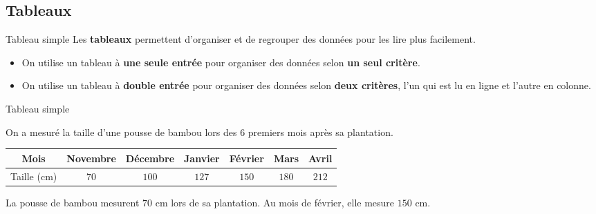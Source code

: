\begin{pageCours} 

\section{Tableaux}

\begin{DefT}{Tableau simple}
Les \textbf{tableaux} permettent d'organiser et de regrouper des données pour les lire plus facilement.
\begin{itemize}
\item On utilise un tableau à \textbf{une seule entrée} pour organiser des données selon \textbf{un seul critère}.
\item On utilise un tableau à \textbf{double entrée} pour organiser des données selon \textbf{deux critères}, l'un qui est lu en ligne et l'autre en colonne.
\end{itemize}
\end{DefT}


\begin{Ex}{Tableau simple}

On a mesuré la taille d'une pousse de bambou lors des 6 premiers mois après sa plantation.
 \begin{center}
 \begin{tabular}{|c|c|c|c|c|c|c|} 
  \hline
  Mois & Novembre & Décembre & Janvier  & Février & Mars & Avril \\
  \hline
  Taille (cm) & $70$ & $100$ & $127$ & $150$ & $180$ & $212$  \\
  \hline
 \end{tabular}
 \end{center}

La pousse de bambou mesurent $70$ cm lors de sa plantation. Au mois de février, elle mesure $150$ cm.
\end{Ex}



\end{pageCours}
